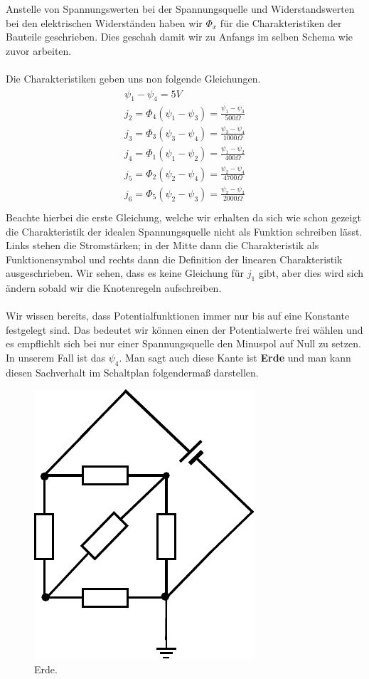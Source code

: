 \documentclass[11pt,a4paper,leqno]{report}
\numberwithin{equation}{chapter}
\begin{document}
\noindent
Anstelle von Spannungswerten bei der Spannungsquelle und Widerstandswerten bei den elektrischen Widerst\"anden haben wir $\Phi_x$ f\"ur die Charakteristiken der Bauteile geschrieben. Dies geschah damit wir zu Anfangs im selben Schema wie zuvor arbeiten. \\
\\
Die Charakteristiken geben uns non folgende Gleichungen.
\begin{align} 
\begin{split}
\psi_1 - \psi_4 = 5V\\
j_2 = \Phi_4(\psi_1 - \psi_3) = \frac{\psi_1 - \psi_3}{500\Omega}\\
j_3 = \Phi_3(\psi_3 - \psi_4) = \frac{\psi_3 - \psi_4}{1000\Omega}\\
j_4 = \Phi_1(\psi_1 - \psi_2) = \frac{\psi_1 - \psi_2}{400\Omega}\\
j_5 = \Phi_2(\psi_2 - \psi_4) = \frac{\psi_2 - \psi_4}{4700\Omega}\\
j_6 = \Phi_5(\psi_2 - \psi_3) = \frac{\psi_2 - \psi_3}{2000\Omega}\\
\end{split}
\end{align}
Beachte hierbei die erste Gleichung, welche wir erhalten da sich wie schon gezeigt die Charakteristik der idealen Spannungsquelle nicht als Funktion schreiben l\"asst. Links stehen die Stromst\"arken; in der Mitte dann die Charakteristik als Funktionensymbol und rechts dann die Definition der linearen Charakteristik ausgeschrieben. Wir sehen, dass es keine Gleichung f\"ur $j_1$ gibt, aber dies wird sich \"andern sobald wir die Knotenregeln aufschreiben.\\
\\
Wir wissen bereits, dass Potentialfunktionen immer nur bis auf eine Konstante festgelegt sind. Das bedeutet wir k\"onnen einen der Potentialwerte frei w\"ahlen und es empfliehlt sich bei nur einer Spannungsquelle den Minuspol auf Null zu setzen. In unserem Fall ist das $\psi_4$. Man sagt auch diese Kante ist \textbf{Erde} und man kann diesen Sachverhalt im Schaltplan folgenderma\ss{} darstellen.
\begin{figure}[H]
	\begin{center}
		\includegraphics[scale=0.8]{erde.pdf}
		\caption{Erde.}
	\end{center}
\end{figure}
\end{document}
